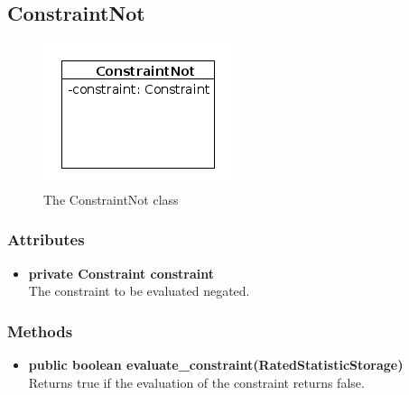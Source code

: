 \subsection{ConstraintNot}
\begin{figure}[htbp]
	\begin{minipage}[t]{8cm}
		\vspace{0pt}
		\centering
		\includegraphics[scale=0.6]{./diagram_pictures/reactor/ConstraintNot.png}
		\caption{The ConstraintNot class}
	\end{minipage}
	\hfill
	\begin{minipage}[t]{8cm}
		\vspace{10pt}
			
	\end{minipage}
\end{figure}  

\subsubsection{Attributes}
\begin{itemize}
	\item \textbf{ private Constraint constraint }\\
	The constraint to be evaluated negated.
\end{itemize}
\subsubsection{Methods}
\begin{itemize}
	\item \textbf{ public boolean evaluate\_constraint(RatedStatisticStorage) }\\
	Returns true if the evaluation of the constraint returns false.
\end{itemize}


\newpage
